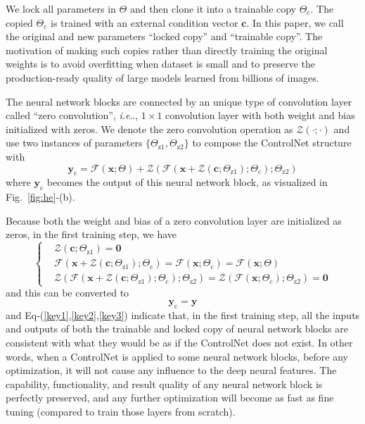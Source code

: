 \documentclass{article}
\makeatletter
\DeclareRobustCommand\onedot{\futurelet\@let@token\@onedot}
\def\@onedot{\ifx\@let@token.\else.\null\fi\xspace}
\def\ie{\emph{i.e}\onedot}
\makeatother
\begin{document}
We lock all parameters in $\Theta$ and then clone it into a trainable copy $\Theta_\text{c}$. The copied $\Theta_\text{c}$ is trained with an external condition vector $\bm{c}$. In this paper, we call the original and new parameters ``locked copy'' and ``trainable copy''. The motivation of making such copies rather than directly training the original weights is to avoid overfitting when dataset is small and to preserve the production-ready quality of large models learned from billions of images.

The neural network blocks are connected by an unique type of convolution layer called ``zero convolution'', \ie, $1\times 1$ convolution layer with both weight and bias initialized with zeros. We denote the zero convolution operation as $\mathcal{Z}(\cdot;\cdot)$ and use two instances of parameters $\{\Theta_\text{z1}, \Theta_\text{z2}\}$ to compose the ControlNet structure with
\begin{equation}
	\label{key1}
	\bm{y}_\text{c}=\mathcal{F}(\bm{x};\Theta)+\mathcal{Z}(\mathcal{F}(\bm{x}+\mathcal{Z}(\bm{c};\Theta_\text{z1});\Theta_\text{c});\Theta_\text{z2})
\end{equation}
where $\bm{y}_\text{c}$ becomes the output of this neural network block, as visualized in Fig.~\ref{fig:he}-(b).

Because both the weight and bias of a zero convolution layer are initialized as zeros, in the first training step, we have
\begin{equation}
	\label{key2}
	\left\{
	\begin{aligned}
		&\mathcal{Z}(\bm{c};\Theta_\text{z1}) = \bm{0} \\
		&\mathcal{F}(\bm{x}+\mathcal{Z}(\bm{c};\Theta_\text{z1});\Theta_\text{c})=\mathcal{F}(\bm{x};\Theta_\text{c}) = \mathcal{F}(\bm{x};\Theta)\\
		&\mathcal{Z}(\mathcal{F}(\bm{x}+\mathcal{Z}(\bm{c};\Theta_\text{z1});\Theta_\text{c});\Theta_\text{z2}) =\mathcal{Z}(\mathcal{F}(\bm{x};\Theta_\text{c});\Theta_\text{z2}) = \bm{0}
	\end{aligned}
	\right.
\end{equation}
and this can be converted to
\begin{equation}
	\label{key3}
	\bm{y}_\text{c} = \bm{y}
\end{equation}
and Eq-(\ref{key1},\ref{key2},\ref{key3}) indicate that, in the first training step, all the inputs and outputs of both the trainable and locked copy of neural network blocks are consistent with what they would be as if the ControlNet does not exist. In other words, when a ControlNet is applied to some neural network blocks, before any optimization, it will not cause any influence to the deep neural features. The capability, functionality, and result quality of any neural network block is perfectly preserved, and any further optimization will become as fast as fine tuning (compared to train those layers from scratch).
\end{document}
